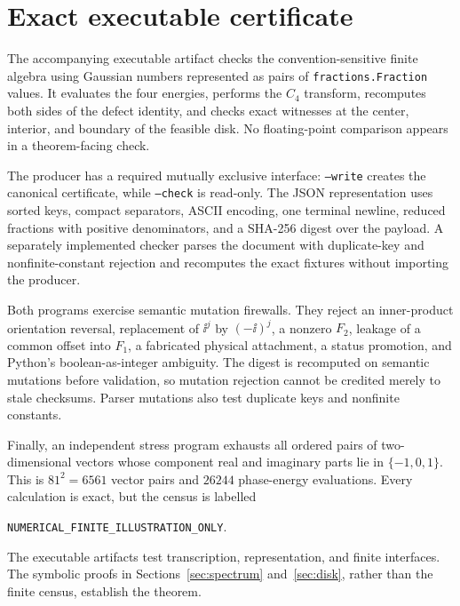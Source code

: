 \section{Exact executable certificate}\label{sec:certificate}

The accompanying executable artifact checks the convention-sensitive finite
algebra using Gaussian numbers represented as pairs of
\texttt{fractions.Fraction} values.  It evaluates the four energies, performs
the $C_4$ transform, recomputes both sides of the defect identity, and checks
exact witnesses at the center, interior, and boundary of the feasible disk.
No floating-point comparison appears in a theorem-facing check.

The producer has a required mutually exclusive interface: \texttt{--write}
creates the canonical certificate, while \texttt{--check} is read-only.  The
JSON representation uses sorted keys, compact separators, ASCII encoding,
one terminal newline, reduced fractions with positive denominators, and a
SHA-256 digest over the payload.  A separately implemented checker parses the
document with duplicate-key and nonfinite-constant rejection and recomputes
the exact fixtures without importing the producer.

Both programs exercise semantic mutation firewalls.  They reject an
inner-product orientation reversal, replacement of $\ii^j$ by $(-\ii)^j$,
a nonzero $F_2$, leakage of a common offset into $F_1$, a fabricated physical
attachment, a status promotion, and Python's boolean-as-integer ambiguity.
The digest is recomputed on semantic mutations before validation, so mutation
rejection cannot be credited merely to stale checksums.  Parser mutations
also test duplicate keys and nonfinite constants.

Finally, an independent stress program exhausts all ordered pairs of
two-dimensional vectors whose component real and imaginary parts lie in
$\{-1,0,1\}$.  This is $81^2=6561$ vector pairs and $26244$ phase-energy
evaluations.  Every calculation is exact, but the census is labelled
\begin{center}
\texttt{NUMERICAL\_FINITE\_ILLUSTRATION\_ONLY}.
\end{center}
The executable artifacts test transcription, representation, and finite
interfaces.  The symbolic proofs in Sections~\ref{sec:spectrum}
and~\ref{sec:disk}, rather than the finite census, establish the theorem.
